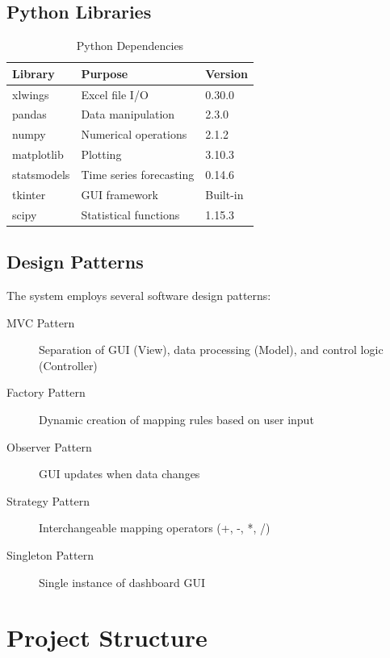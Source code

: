 \subsection{Python Libraries}

\begin{table}[H]
\centering
\begin{tabularx}{\textwidth}{lXl}
\toprule
\textbf{Library} & \textbf{Purpose} & \textbf{Version} \\
\midrule
xlwings & Excel file I/O & 0.30.0 \\
pandas & Data manipulation & 2.3.0 \\
numpy & Numerical operations & 2.1.2 \\
matplotlib & Plotting & 3.10.3 \\
statsmodels & Time series forecasting & 0.14.6 \\
tkinter & GUI framework & Built-in \\
scipy & Statistical functions & 1.15.3 \\
\bottomrule
\end{tabularx}
\caption{Python Dependencies}
\end{table}

\subsection{Design Patterns}

The system employs several software design patterns:

\begin{description}
    \item[MVC Pattern] Separation of GUI (View), data processing (Model), and control logic (Controller)
    \item[Factory Pattern] Dynamic creation of mapping rules based on user input
    \item[Observer Pattern] GUI updates when data changes
    \item[Strategy Pattern] Interchangeable mapping operators (+, -, *, /)
    \item[Singleton Pattern] Single instance of dashboard GUI
\end{description}

\section{Project Structure}

